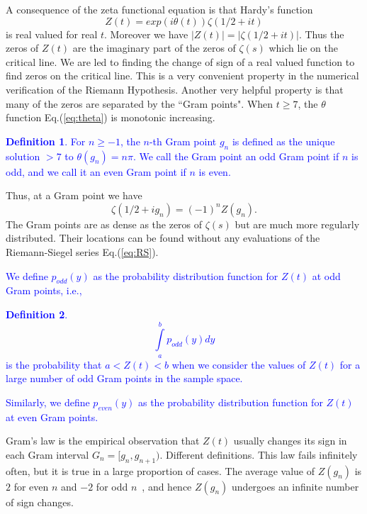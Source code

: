\documentclass[twoside]{article}
\theoremstyle{definition}
\newtheorem{defn}{Definition}
\begin{document}
A consequence of the zeta functional equation is that Hardy's function 
\begin{equation}
Z(t)=exp(i\theta(t))\zeta(1/2 +it) 
\label{eq:hardy}
\end{equation}
is real valued for real $t$. 
Moreover we have $|Z(t)| = |\zeta(1/2+it)|$. Thus the zeros of $Z(t)$ are the imaginary part of the zeros 
of $\zeta(s)$ which lie on the critical line. We are led to finding the change of sign of a real valued function 
to find zeros on the critical line. This is a very convenient property in the numerical verification 
of the Riemann Hypothesis. Another very helpful property is that many of the zeros are separated by the
``Gram points".  When $t \ge 7$, the $\theta$ function Eq.(\ref{eq:theta}) is monotonic increasing. 
\textcolor{blue}{
\begin{defn}\label{gram}
For $n \ge -1$, the $n$-th Gram point $g_n$ is defined as the unique solution $> 7$ to
$\theta (g_n) = n\pi$. We call the Gram point an odd Gram point if $n$ is odd, and we call it an even Gram point if $n$ is even.
\end{defn}
}
Thus, at a Gram point we have
\begin{equation}
\zeta(1/2+ig_n) = (-1)^{n}Z(g_n).
\label{eq:zetagram}
\end{equation}
The Gram points are as dense as the zeros of $\zeta(s)$ but are much more regularly distributed.
Their locations can be found without any evaluations of the Riemann-Siegel series Eq.(\ref{eq:RS}).
 \textcolor{blue}{We define $p_{odd}(y)$ as the probability distribution function for $Z(t)$ at odd Gram points, i.e., 
\begin{defn}\label{podd}
\begin{equation}
\int\limits_{a}^{b} p_{odd}(y)dy
\label{eq:pdfodd}
\end{equation}
is the probability that $a<Z(t)<b$ when we consider the values of $Z(t)$ for a large number of odd Gram points in the sample space. 
\end{defn}
Similarly, we define $p_{even}(y)$ as the probability distribution function for $Z(t)$ at even Gram points. }

Gram's law is the empirical observation that $Z(t)$ usually changes its sign in each Gram interval 
$G_n = [g_n,g_{n+1})$. Different definitions.
This law fails infinitely often, but it is true in a large proportion of cases.
The average value of $Z(g_n)$ is $2$ for even $n$ and $-2$ for odd $n$~\cite{Titchmarsh 1986},
and hence $Z(g_n)$ undergoes an infinite number of sign changes.
\end{document}
